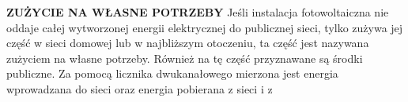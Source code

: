 \documentclass[12pt,a4paper]{article}
\begin{document}
\textbf{ZUŻYCIE NA WŁASNE POTRZEBY}
Jeśli instalacja fotowoltaiczna nie oddaje całej wytworzonej energii elektrycznej do publicznej sieci, tylko zużywa jej część w sieci domowej lub w najbliższym otoczeniu, ta część jest nazywana zużyciem na własne potrzeby. Również na tę część przyznawane są środki publiczne. Za pomocą licznika dwukanałowego mierzona jest energia wprowadzana do sieci oraz energia pobierana z sieci i z



\printindex
\end{document}
